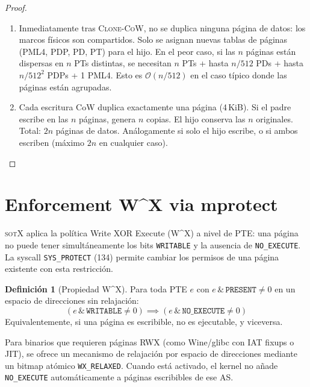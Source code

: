 \documentclass[11pt,twoside,openright]{book}
\theoremstyle{definition}
\newtheorem{definition}{Definición}[chapter]
\theoremstyle{plain}
\theoremstyle{remark}
\newcommand{\sotos}{\textsc{sotX}}
\newcommand{\bigO}{\mathcal{O}}
\begin{document}
\begin{proof}
\begin{enumerate}
    \item Inmediatamente tras \textsc{Clone-CoW}, no se duplica ninguna página
          de datos: los marcos físicos son compartidos. Solo se asignan nuevas
          tablas de páginas (PML4, PDP, PD, PT) para el hijo. En el peor caso,
          si las $n$ páginas están dispersas en $n$ PTs distintas, se necesitan
          $n$ PTs + hasta $n/512$ PDs + hasta $n/512^2$ PDPs + 1 PML4.
          Esto es $\bigO(n/512)$ en el caso típico donde las páginas están
          agrupadas.

    \item Cada escritura CoW duplica exactamente una página (4\,KiB). Si el padre
          escribe en las $n$ páginas, genera $n$ copias. El hijo conserva las $n$
          originales. Total: $2n$ páginas de datos. Análogamente si solo el hijo
          escribe, o si ambos escriben (máximo $2n$ en cualquier caso). \qedhere
\end{enumerate}
\end{proof}

\section{Enforcement W\^{}X via mprotect}
\label{sec:wx}

\sotos{} aplica la política Write XOR Execute (W\^{}X) a nivel de PTE: una página
no puede tener simultáneamente los bits \texttt{WRITABLE} y la ausencia de
\texttt{NO\_EXECUTE}. La syscall \texttt{SYS\_PROTECT} (134) permite cambiar los
permisos de una página existente con esta restricción.

\begin{definition}[Propiedad W\^{}X]
Para toda PTE $e$ con $e \,\texttt{\&}\, \texttt{PRESENT} \neq 0$ en un espacio
de direcciones sin relajación:
\[
(e \,\texttt{\&}\, \texttt{WRITABLE} \neq 0) \implies (e \,\texttt{\&}\, \texttt{NO\_EXECUTE} \neq 0)
\]
Equivalentemente, si una página es escribible, no es ejecutable, y viceversa.
\end{definition}

Para binarios que requieren páginas RWX (como Wine/glibc con IAT fixups o JIT),
se ofrece un mecanismo de relajación por espacio de direcciones mediante un bitmap
atómico \texttt{WX\_RELAXED}. Cuando está activado, el kernel no añade
\texttt{NO\_EXECUTE} automáticamente a páginas escribibles de ese AS.
\end{document}
